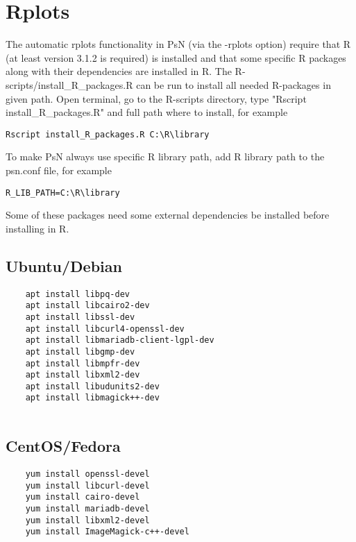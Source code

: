 \section{Rplots}

The automatic rplots functionality in PsN (via the -rplots option) require that R (at least version 3.1.2 is required) is installed and that some specific R packages along with their dependencies are installed in R. The R-scripts/install\_R\_packages.R can be run to install all needed R-packages in given path. Open terminal, go to the R-scripts directory, type "Rscript install\_R\_packages.R" and full path where to install, for example

\begin{verbatim}
Rscript install_R_packages.R C:\R\library
\end{verbatim}

To make PsN always use specific R library path, add R library path to the psn.conf file, for example

\begin{verbatim}
R_LIB_PATH=C:\R\library
\end{verbatim}

Some of these packages need some external dependencies be installed before installing in R.

\subsection{Ubuntu/Debian}
\begin{verbatim}
    apt install libpq-dev
    apt install libcairo2-dev
    apt install libssl-dev
    apt install libcurl4-openssl-dev
    apt install libmariadb-client-lgpl-dev
    apt install libgmp-dev
    apt install libmpfr-dev
    apt install libxml2-dev
    apt install libudunits2-dev
    apt install libmagick++-dev
    
\end{verbatim}

\subsection{CentOS/Fedora}
\begin{verbatim}
    yum install openssl-devel
    yum install libcurl-devel
    yum install cairo-devel
    yum install mariadb-devel
    yum install libxml2-devel
    yum install ImageMagick-c++-devel
    
\end{verbatim}

